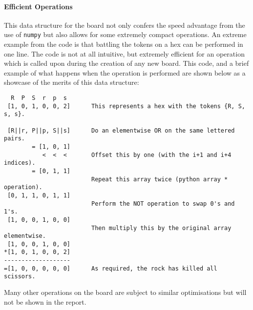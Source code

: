 \documentclass{article}
\begin{document}
\paragraph{Efficient Operations}
This data structure for the board not only confers the speed advantage from the use of \verb|numpy| but also allows for some extremely compact operations. An extreme example from the code is that battling the tokens on a hex can be performed in one line. The code is not at all intuitive, but extremely efficient for an operation which is called upon during the creation of any new board. This code, and a brief example of what happens when the operation is performed are shown below as a showcase of the merits of this data structure:



\begin{center}
\begin{BVerbatim}
  R  P  S  r  p  s
 [1, 0, 1, 0, 0, 2]      This represents a hex with the tokens {R, S, s, s}.
 
 [R||r, P||p, S||s]      Do an elementwise OR on the same lettered pairs.
        = [1, 0, 1]
           <  <  <       Offset this by one (with the i+1 and i+4 indices).
        = [0, 1, 1]      
                         Repeat this array twice (python array * operation).
 [0, 1, 1, 0, 1, 1]
                         Perform the NOT operation to swap 0's and 1's.
 [1, 0, 0, 1, 0, 0]      
                         Then multiply this by the original array elementwise.
 [1, 0, 0, 1, 0, 0]
*[1, 0, 1, 0, 0, 2]
-------------------
=[1, 0, 0, 0, 0, 0]      As required, the rock has killed all scissors.
\end{BVerbatim}
\end{center}
Many other operations on the board are subject to similar optimisations but will not be shown in the report.
\end{document}

